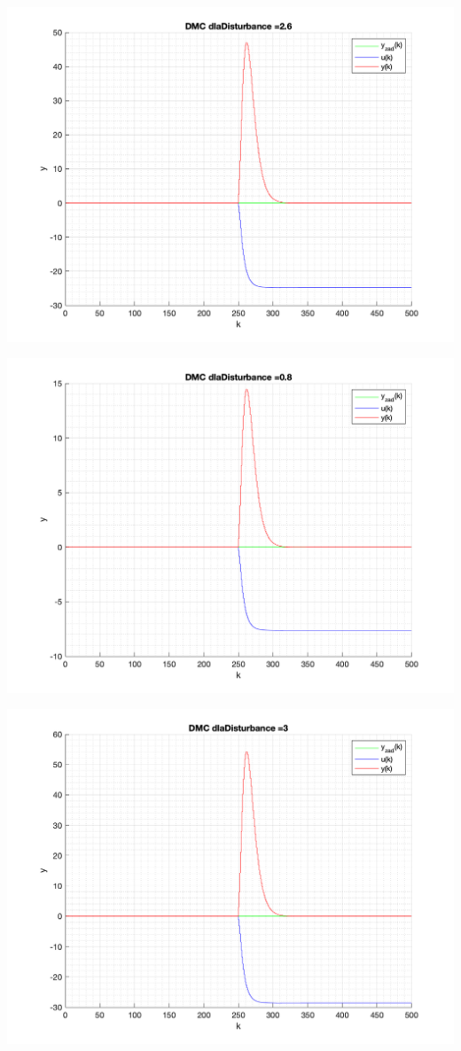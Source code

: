 \documentclass[a4paper, 11pt]{article}
\begin{document}
\begin{enumerate}
 \includegraphics[width=\linewidth]{./ModelsP4_Disturbance/P4_DMC_Disturbance_2_6_png.png} 
 
 \includegraphics[width=\linewidth]{./ModelsP4_Disturbance/P4_DMC_Disturbance_0_8_png.png} 
 
 \includegraphics[width=\linewidth]{./ModelsP4_Disturbance/P4_DMC_Disturbance_3_png.png} 
 

\end{enumerate}
\end{document}
